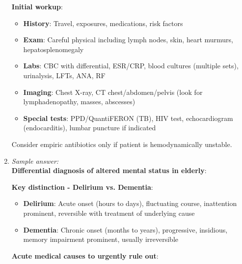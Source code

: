 \documentclass[11pt]{article}
\begin{document}
\begin{enumerate}[label=\textbf{\arabic*.}]
  \textbf{Initial workup}:
  \begin{itemize}
    \item \textbf{History}: Travel, exposures, medications, risk factors
    \item \textbf{Exam}: Careful physical including lymph nodes, skin, heart murmurs, hepatosplenomegaly
    \item \textbf{Labs}: CBC with differential, ESR/CRP, blood cultures (multiple sets), urinalysis, 
    LFTs, ANA, RF
    \item \textbf{Imaging}: Chest X-ray, CT chest/abdomen/pelvis (look for lymphadenopathy, masses, abscesses)
    \item \textbf{Special tests}: PPD/QuantiFERON (TB), HIV test, echocardiogram (endocarditis), 
    lumbar puncture if indicated
  \end{itemize}

  Consider empiric antibiotics only if patient is hemodynamically unstable.

  \item \emph{Sample answer:}\\
  \textbf{Differential diagnosis of altered mental status in elderly}:

  \textbf{Key distinction - Delirium vs. Dementia}:
  \begin{itemize}
    \item \textbf{Delirium}: Acute onset (hours to days), fluctuating course, inattention prominent, 
    reversible with treatment of underlying cause
    \item \textbf{Dementia}: Chronic onset (months to years), progressive, insidious, memory impairment 
    prominent, usually irreversible
  \end{itemize}

  \textbf{Acute medical causes to urgently rule out}:
\end{enumerate}
\end{document}
